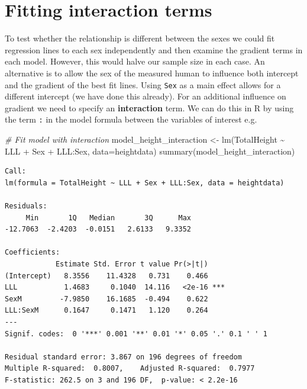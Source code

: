 \documentclass[
  oneside]{krantz}
\newenvironment{Shaded}{\begin{snugshade}}{\end{snugshade}}
\newcommand{\AttributeTok}[1]{\textcolor[rgb]{0.77,0.63,0.00}{#1}}
\newcommand{\CommentTok}[1]{\textcolor[rgb]{0.56,0.35,0.01}{\textit{#1}}}
\newcommand{\FunctionTok}[1]{\textcolor[rgb]{0.00,0.00,0.00}{#1}}
\newcommand{\NormalTok}[1]{#1}
\newcommand{\OtherTok}[1]{\textcolor[rgb]{0.56,0.35,0.01}{#1}}
\newcommand{\SpecialCharTok}[1]{\textcolor[rgb]{0.00,0.00,0.00}{#1}}
\begin{document}
\hypertarget{fitting-interaction-terms}{%
\section{Fitting interaction terms}\label{fitting-interaction-terms}}

To test whether the relationship is different between the sexes we could fit regression lines to each sex independently and then examine the gradient terms in each model. However, this would halve our sample size in each case. An alternative is to allow the sex of the measured human to influence both intercept and the gradient of the best fit lines. Using \texttt{Sex} as a main effect allows for a different intercept (we have done this already). For an additional influence on gradient we need to specify an \textbf{interaction} term. We can do this in R by using the term \texttt{:} in the model formula between the variables of interest e.g.~

\begin{Shaded}
\begin{Highlighting}[]
\CommentTok{\# Fit model with interaction}
\NormalTok{model\_height\_interaction }\OtherTok{\textless{}{-}} \FunctionTok{lm}\NormalTok{(TotalHeight }\SpecialCharTok{\textasciitilde{}}\NormalTok{ LLL }\SpecialCharTok{+}\NormalTok{ Sex }\SpecialCharTok{+}\NormalTok{ LLL}\SpecialCharTok{:}\NormalTok{Sex,}
                               \AttributeTok{data=}\NormalTok{heightdata)}
\FunctionTok{summary}\NormalTok{(model\_height\_interaction)}
\end{Highlighting}
\end{Shaded}

\begin{verbatim}
Call:
lm(formula = TotalHeight ~ LLL + Sex + LLL:Sex, data = heightdata)

Residuals:
     Min       1Q   Median       3Q      Max 
-12.7063  -2.4203  -0.0151   2.6133   9.3352 

Coefficients:
            Estimate Std. Error t value Pr(>|t|)    
(Intercept)   8.3556    11.4328   0.731    0.466    
LLL           1.4683     0.1040  14.116   <2e-16 ***
SexM         -7.9850    16.1685  -0.494    0.622    
LLL:SexM      0.1647     0.1471   1.120    0.264    
---
Signif. codes:  0 '***' 0.001 '**' 0.01 '*' 0.05 '.' 0.1 ' ' 1

Residual standard error: 3.867 on 196 degrees of freedom
Multiple R-squared:  0.8007,    Adjusted R-squared:  0.7977 
F-statistic: 262.5 on 3 and 196 DF,  p-value: < 2.2e-16
\end{verbatim}
\end{document}
